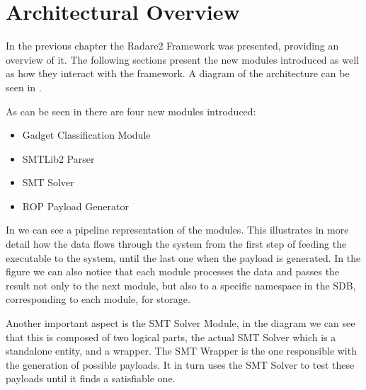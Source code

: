 \chapter{Architectural Overview}
\label{chapter:architecture}

In the previous chapter the Radare2 Framework was presented, providing an overview of it. The following sections present the new modules introduced as well as how they interact with the framework. A diagram of the architecture can be seen in .


As can be seen in  there are four new modules introduced:
\begin{itemize}
	\item Gadget Classification Module
	\item SMTLib2 Parser
	\item SMT Solver
	\item ROP Payload Generator
\end{itemize}


In  we can see a pipeline representation of the modules. This illustrates in more detail how the data flows through the system from the first step of feeding the executable to the system, until the last one when the payload is generated. In the figure we can also notice that each module processes the data and passes the result not only to the next module, but also to a specific namespace in the SDB, corresponding to each module, for storage.

Another important aspect is the SMT Solver Module, in the diagram we can see that this is composed of two logical parts, the actual SMT Solver which is a standalone entity, and a wrapper. The SMT Wrapper is the one responsible with the generation of possible payloads. It in turn uses the SMT Solver to test these payloads until it finds a satisfiable one.


